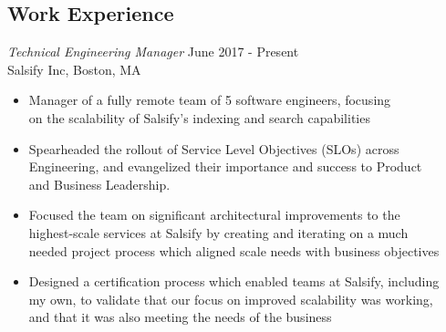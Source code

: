\documentclass[line,margin]{res}
\begin{document}
\address{399 Pleasant St, Canton MA, 02021}
\address{(563) 581-8229\\ \href{mailto:eric.d.brown23@gmail.com}{eric.d.brown23@gmail.com}}

    \begin{resume}
        \section{Work Experience}
            {\sl Technical Engineering Manager} \hfill June 2017 - Present \\
            Salsify Inc, Boston, MA
                \begin{itemize} \itemsep -2pt %
                    \item Manager of a fully remote team of 5 software engineers, focusing \\
                          on the scalability of Salsify's indexing and search capabilities
                    \item Spearheaded the rollout of Service Level Objectives (SLOs) across \\
                          Engineering, and evangelized their importance and success to Product \\
                          and Business Leadership.
                    \item Focused the team on significant architectural improvements to the \\
                          highest-scale services at Salsify by creating and iterating on a much \\
                          needed project process which aligned scale needs with business objectives
                    \item Designed a certification process which enabled teams at Salsify, including \\
                          my own, to validate that our focus on improved scalability was working, \\
                          and that it was also meeting the needs of the business
                \end{itemize}


\end{resume}
\end{document}
